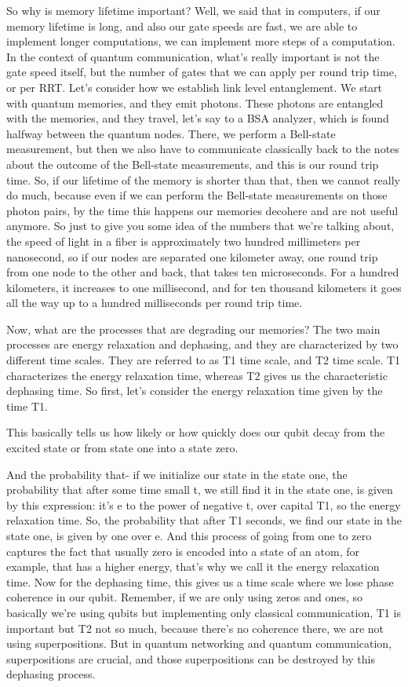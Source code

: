 So why is memory lifetime important? Well, we said that in computers, if our memory lifetime is long, and also our gate speeds are fast, we are able to implement longer computations, we can implement more steps of a computation. In the context of quantum communication, what's really important is not the gate speed itself, but the number of gates that we can apply per round trip time, or per RRT. Let's consider how we establish link level entanglement. We start with quantum memories, and they emit photons. These photons are entangled with the memories, and they travel, let's say to a BSA analyzer, which is found halfway between the quantum nodes. There, we perform a Bell-state measurement, but then we also have to communicate classically back to the notes about the outcome of the Bell-state measurements, and this is our round trip time. So, if our lifetime of the memory is shorter than that, then we cannot really do much, because even if we can perform the Bell-state measurements on those photon pairs, by the time this happens our memories decohere and are not useful anymore. So just to give you some idea of the numbers that we're talking about, the speed of light in a fiber is approximately two hundred millimeters per nanosecond, so if our nodes are separated one kilometer away, one round trip from one node to the other and back, that takes ten microseconds. For a hundred kilometers, it increases to one millisecond, and for ten thousand kilometers it goes all the way up to a hundred milliseconds per round trip time.

Now, what are the processes that are degrading our memories? The two main processes are energy relaxation and dephasing, and they are characterized by two different time scales. They are referred to as T1 time scale, and T2 time scale. T1 characterizes the energy relaxation time, whereas T2 gives us the characteristic dephasing time. So first, let's consider the energy relaxation time given by the time T1.

This basically tells us how likely or how quickly does our qubit decay from the excited state or from state one into a state zero.

And the probability that- if we initialize our state in the state one, the probability that after some time small t, we still find it in the state one, is given by this expression: it's e to the power of negative t, over capital T1, so the energy relaxation time. So, the probability that after T1 seconds, we find our state in the state one, is given by one over e. And this process of going from one to zero captures the fact that usually zero is encoded into a state of an atom, for example, that has a higher energy, that's why we call it the energy relaxation time. Now for the dephasing time, this gives us a time scale where we lose phase coherence in our qubit. Remember, if we are only using zeros and ones, so basically we're using qubits but implementing only classical communication, T1 is important but T2 not so much, because there's no coherence there, we are not using superpositions. But in quantum networking and quantum communication, superpositions are crucial, and those superpositions can be destroyed by this dephasing process.


